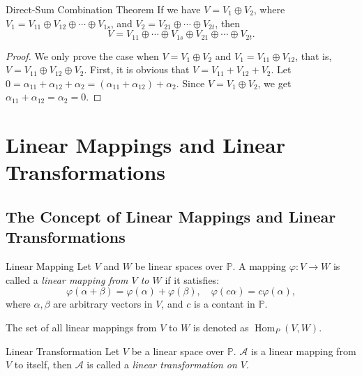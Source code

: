\begin{proposition}{Direct-Sum Combination Theorem}{}
  If we have $V = V_1 \oplus V_2$,
  where $V_1 = V_{11} \oplus V_{12} \oplus \cdots \oplus V_{1s}$,
  and $V_2 = V_{21} \oplus \cdots \oplus V_{2t}$,
  then
  \begin{equation}
    V = V_{11} \oplus \cdots \oplus V_{1s} \oplus V_{21} \oplus \cdots \oplus V_{2t}.
  \end{equation}
\end{proposition}

\begin{proof}
  We only prove the case when $V = V_1 \oplus V_2$ and $V_1 = V_{11} \oplus
  V_{12}$,
  that is, $V = V_{11} \oplus V_{12} \oplus V_2$.
  First, it is obvious that $V = V_{11} + V_{12} + V_2$.
  Let $0 = \alpha_{11} + \alpha_{12} + \alpha_2 = (\alpha_{11} + \alpha_{12}) + \alpha_2$.
  Since $V = V_1 \oplus V_2$,
  we get $\alpha_{11} + \alpha_{12} = \alpha_2 = 0$.
\end{proof}


\section{Linear Mappings and Linear Transformations}

\subsection{The Concept of Linear Mappings and Linear Transformations}

\begin{definition}{Linear Mapping}{}
  Let $V$ and $W$ be linear spaces over $\mathbb{P}$.
  A mapping $\varphi: V \rightarrow W$ is called a \emph{linear mapping from $V$
  to $W$}
  if it satisfies:
  \begin{equation}
    \varphi(\alpha + \beta) = \varphi(\alpha) + \varphi(\beta), \quad
    \varphi(c \alpha) = c \varphi(\alpha),
  \end{equation}
  where $\alpha, \beta$ are arbitrary vectors in $V$,
  and $c$ is a contant in $\mathbb{P}$.
\end{definition}

\begin{note}
  The set of all linear mappings from $V$ to $W$ is denoted as $\operatorname{Hom}_P(V, W)$.
\end{note}

\begin{definition}{Linear Transformation}{}
  Let $V$ be a linear space over $\mathbb{P}$.
  $\mathcal{A}$ is a linear mapping from $V$ to itself,
  then $\mathcal{A}$ is called a \emph{linear transformation on $V$}.
\end{definition}

